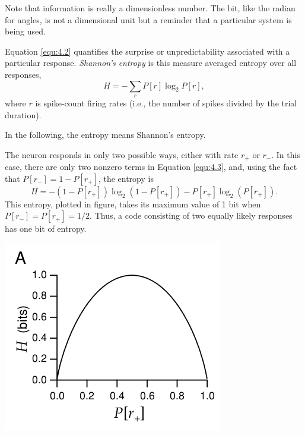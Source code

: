 \begin{rem}
  Note that information is really a dimensionless number. The bit, like the radian for angles, is not a dimensional unit but a reminder that a particular system is being used.
\end{rem}

\begin{defn}
  \label{def:ShannonEntropy}
  Equation \ref{equ:4.2} quantifies the surprise or unpredictability associated with a particular response. \emph{Shannon's entropy} is this measure averaged entropy over all responses,
\begin{equation}
  \label{equ:4.3}
  H=-\sum\limits_rP[r]\log_2P[r],
\end{equation}
where $r$ is spike-count firing rates (i.e., the number of spikes divided by the trial duration).
\end{defn}

\begin{ntn}
  In the following, the entropy means Shannon's entropy.
\end{ntn}

\begin{exm}
   The neuron responds in only two possible ways, either with rate $r_+$ or $r_-$. In
this case, there are only two nonzero terms in Equation \ref{equ:4.3}, and, using
the fact that $P[r_-]=1-P[r_+]$, the entropy is
\begin{equation*}
  \label{equ:4.4}
  H=-(1-P[r_+])\log_2(1-P[r_+])-P[r_+]\log_2(P[r_+]).
\end{equation*}
This entropy, plotted in figure, takes its maximum value of 1 bit when
$P[r_-]=P[r_+]=1/2$. Thus, a code consisting of two equally likely responses has one bit of entropy.
\begin{center}
    \label{fig:4-1}
  \includegraphics[scale = 0.4]{./png/4-1A}
\end{center}
\end{exm}

